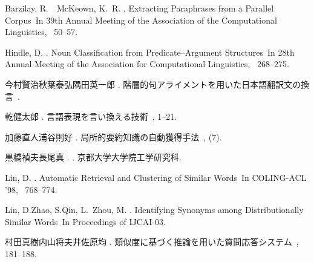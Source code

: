 
\begin{thebibliography}{}

Barzilay, R.\BBACOMMA\  \BBA\ McKeown, K.~R. \BBCP.
\newblock \BBOQ Extracting Paraphrases from a Parallel Corpus\BBCQ\
\newblock In {\Bem 39th Annual Meeting of the Association of the Computational
  Linguistics}, \BPGS\ 50--57.

Hindle, D. \BBCP.
\newblock \BBOQ Noun Classification from Predicate--Argument Structures\BBCQ\
\newblock In {\Bem 28th Annual Meeting of the Association for Computational
  Linguistics}, \BPGS\ 268--275.

今村賢治\JBA 秋葉泰弘\JBA  隅田英一郎 \BBCP.
\newblock \JBOQ 階層的句アライメントを用いた日本語翻訳文の換言\JBCQ\
\newblock {}.

乾健太郎 \BBOP 2002\BBCP.
\newblock \JBOQ 言語表現を言い換える技術\JBCQ\
\newblock {}, 1--21.

加藤直人\JBA  浦谷則好 \BBCP.
\newblock \JBOQ 局所的要約知識の自動獲得手法\JBCQ\
\newblock {}, {}  (7).

黒橋禎夫\JBA  長尾真 \BBOP 1998\BBCP.
\newblock {}.
\newblock 京都大学大学院工学研究科.

Lin, D. \BBOP 1998\BBCP.
\newblock \BBOQ Automatic Retrieval and Clustering of Similar Words\BBCQ\
\newblock In {\Bem COLING-ACL '98}, \BPGS\ 768--774.

Lin, D.\JBA Zhao, S.\JBA Qin, L.\JBA  \BBA\ Zhou, M. \BBCP.
\newblock \BBOQ Identifying Synonyms among Distributionally Similar Words\BBCQ\
\newblock In {\Bem Proceedings of IJCAI-03}.

村田真樹\JBA 内山将夫\JBA  井佐原均 \BBOP 2000\BBCP.
\newblock \JBOQ 類似度に基づく推論を用いた質問応答システム\JBCQ\
\newblock {}, 181--188.


\end{thebibliography}
